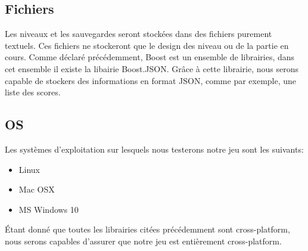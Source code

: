 \subsection{Fichiers}
Les niveaux et les sauvegardes seront stockées dans des fichiers purement textuels. Ces fichiers ne stockeront que le design des niveau ou de la partie en cours.
Comme déclaré précédemment, Boost est un ensemble de librairies, dans cet ensemble il existe la libairie Boost.JSON. Grâce à cette librairie, nous serons capable de stockers des informations en format JSON, comme par exemple, une liste des scores.

\subsection{OS}
Les systèmes d'exploitation sur lesquels nous testerons notre jeu sont les suivants:
\begin{itemize}
	\item Linux
	\item Mac OSX
	\item MS Windows 10
\end{itemize}
Étant donné que toutes les librairies citées précédemment sont cross-platform, nous serons capables d'assurer que notre jeu est entièrement cross-platform.
